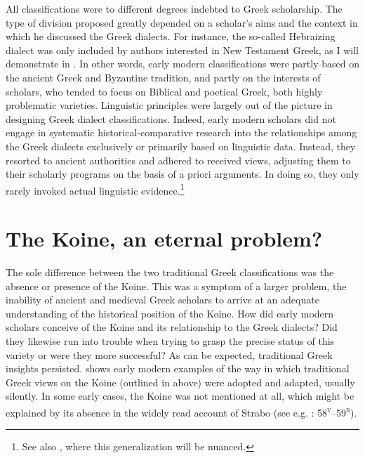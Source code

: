 All classifications were to different degrees indebted to Greek scholarship. The type of division proposed greatly depended on a scholar’s aims and the context in which he discussed the Greek dialects. For instance, the so-called Hebraizing dialect was only included by authors interested in New Testament Greek, as I will demonstrate in . In other words, early modern classifications were partly based on the ancient Greek and Byzantine tradition, and partly on the interests of scholars, who tended to focus on Biblical and poetical Greek, both highly problematic varieties. Linguistic principles were largely out of the picture in designing Greek dialect classifications. Indeed, early modern scholars did not engage in systematic historical-comparative research into the relationships among the Greek dialects exclusively or primarily based on linguistic data. Instead, they resorted to ancient authorities and adhered to received views, adjusting them to their scholarly programs on the basis of a priori arguments. In doing so, they only rarely invoked actual linguistic evidence.\footnote{See also , where this generalization will be nuanced.}

\section{The Koine, an eternal problem?}\label{sec:2.9}

The sole difference between the two traditional Greek classifications was the absence or presence of the Koine. This was a symptom of a larger problem, the inability of ancient and medieval Greek scholars to arrive at an adequate understanding of the historical position of the Koine. How did early modern scholars conceive of the Koine and its relationship to the Greek dialects? Did they likewise run into trouble when trying to grasp the precise status of this variety or were they more successful? As can be expected, traditional Greek insights persisted.  shows early modern examples of the way in which traditional Greek views on the Koine (outlined in  above) were adopted and adapted, usually silently. In some early cases, the Koine was not mentioned at all, which might be explained by its absence in the widely read account of Strabo (see e.g. \citealt{Stapleton1566}: 58\textsc{\textsuperscript{v}}–59\textsc{\textsuperscript{r}}).

